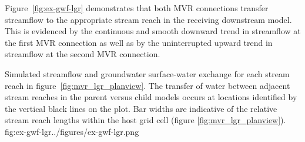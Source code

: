 


Figure~\ref{fig:ex-gwf-lgr} demonstrates that both MVR connections transfer streamflow to the appropriate stream reach in the receiving downstream model.  This is evidenced by the continuous and smooth downward trend in streamflow at the first MVR connection as well as by the uninterrupted upward trend in streamflow at the second MVR connection.  

\begin{StandardFigure}
	{Simulated streamflow and groundwater surface-water exchange for each stream reach in figure~\ref{fig:mvr_lgr_planview}.  The transfer of water between adjacent stream reaches in the parent versus child models occurs at locations identified by the vertical black lines on the plot. Bar widths are indicative of the relative stream reach lengths within the host grid cell (figure \ref{fig:mvr_lgr_planview}).}
	{fig:ex-gwf-lgr}{../figures/ex-gwf-lgr.png}
\end{StandardFigure}
